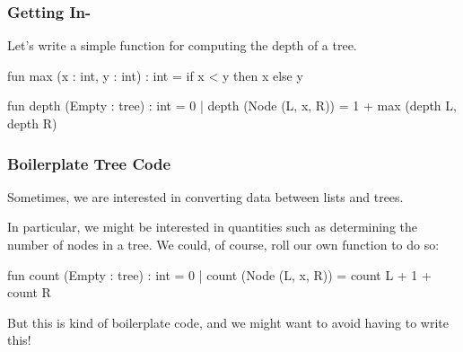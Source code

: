 \documentclass[aspectratio=169, handout]{beamer}
\begin{document}
\begin{frame}[fragile]
  \frametitle{Getting In-}

  Let's write a simple function for computing the depth of a tree.

  \pause
  \begin{codeblock}
    fun max (x : int, y : int) : int =
      if x < y then x else y

    fun depth (Empty : tree) : int = 0
      | depth (Node (L, x, R)) = 1 + max (depth L, depth R)
  \end{codeblock}

  \vspace{\fill}


\end{frame}


\begin{frame}[fragile]
  \frametitle{Boilerplate Tree Code}

  Sometimes, we are interested in converting data between lists and trees.

  \pause
  \vspace{\fill}

  In particular, we might be interested in quantities such as determining the
  number of nodes in a tree. We could, of course, roll our own function to do
  so:

  \pause
  \begin{codeblock}
    fun count (Empty : tree) : int = 0
      | count (Node (L, x, R)) = count L + 1 + count R
  \end{codeblock}

  \pause
  \vspace{\fill}

  But this is kind of boilerplate code, and we might want to avoid having to
  write this!
\end{frame}
\end{document}
